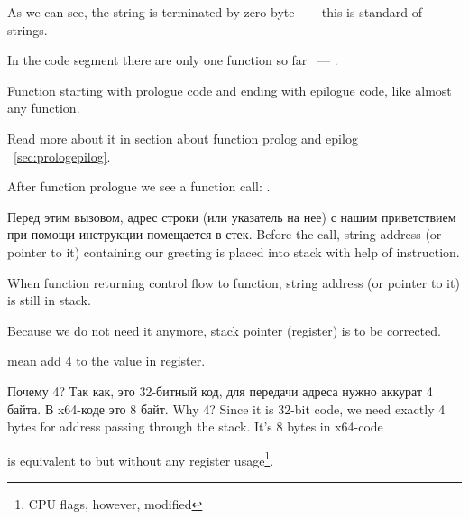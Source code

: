 {As we can see, the string is terminated by zero byte ~--- this is \CCpp standard of strings.}

{In the code segment  there are only one function so far ~--- \main.}

{Function \main starting with prologue code and ending with epilogue code, like almost any function.}

{Read more about it in section about function prolog and epilog}
~\ref{sec:prologepilog}.

{After function prologue we see a function \printf call}: . 

\IFRU
{Перед этим вызовом, адрес строки (или указатель на нее) с нашим приветствием при помощи инструкции \PUSH помещается в стек.}
{Before the call, string address (or pointer to it) containing our greeting is placed into stack with help of \PUSH instruction.}

{When \printf function returning control flow to \main function, string address (or pointer to it) is still in stack.}

{Because we do not need it anymore, stack pointer (\ESP register) is to be corrected.}

 
{mean add 4 to the value in \ESP register.}

\IFRU
{Почему 4? Так как, это 32-битный код, для передачи адреса нужно аккурат 4 байта. В x64-коде это 8 байт.}
{Why 4? Since it is 32-bit code, we need exactly 4 bytes for address passing through the stack. 
It's 8 bytes in x64-code}

 
{is equivalent to  but without any register usage\footnote{CPU flags, however, modified}.}

